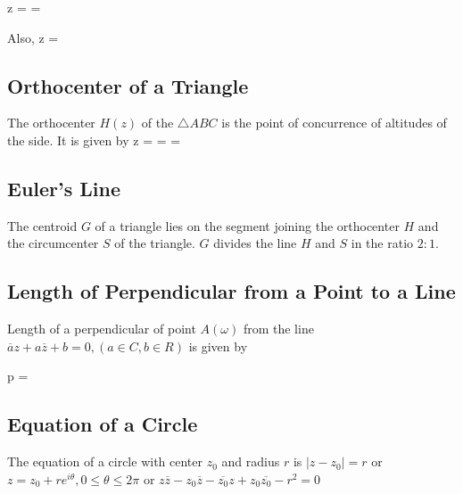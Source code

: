 \startformula z = \stopformula
\startformula = \stopformula

Also,
\startformula z = \stopformula

\subsection{Orthocenter of a Triangle}
The orthocenter $H(z)$ of the $\triangle ABC$ is the point of concurrence of altitudes of the side. It is given by
\startformula z = \stopformula
\startformula = \stopformula
\startformula = \stopformula

\subsection{Euler's Line}
The centroid $G$ of a triangle lies on the segment joining the orthocenter $H$ and the circumcenter $S$ of the triangle. $G$
divides the line $H$ and $S$ in the ratio $2:1$.

\subsection{Length of Perpendicular from a Point to a Line}
Length of a perpendicular of point $A(\omega)$ from the line $\overline{a}z + a\overline{z} + b = 0, (a\in C, b\in R)$
is given by

\startformula p = \stopformula

\subsection{Equation of a Circle}
The equation of a circle with center $z_0$ and radius $r$ is $|z- z_0| = r$ or $z = z_0 + re^{i\theta}, 0\leq \theta\leq 2\pi$ or
$z\overline{z} - z_0\overline{z} - \overline{z_0}z + z_0\overline{z_0} - r^2 = 0$

